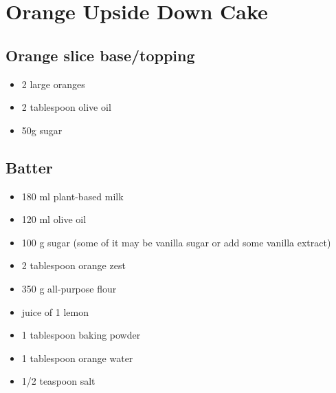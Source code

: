 \section*{Orange Upside Down Cake}

\subsection*{Orange slice base/topping}
\begin{itemize}
 \item 2 large oranges
 \item 2 tablespoon olive oil
 \item 50g sugar
\end{itemize}

\subsection*{Batter}
 \begin{itemize}
 \item 180 ml plant-based milk
 \item 120 ml olive oil
 \item 100 g sugar (some of it may be vanilla sugar or add some vanilla extract)
 \item 2 tablespoon orange zest
 \item 350 g all-purpose flour
 \item juice of 1 lemon
 \item 1 tablespoon baking powder
 \item 1 tablespoon orange water
 \item 1/2 teaspoon salt
\end{itemize}

